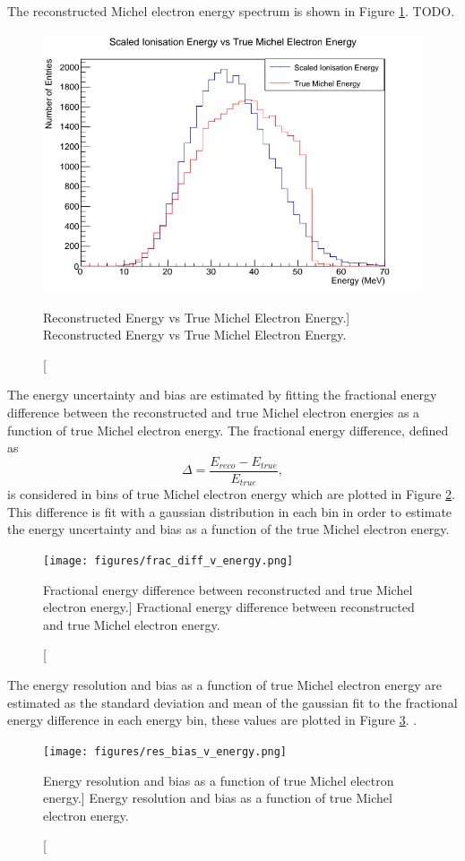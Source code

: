 The reconstructed Michel electron energy spectrum is shown in Figure
\ref{fig:reco_v_mich}. TODO.
\begin{figure}
	\centering
	\includegraphics[width=\textwidth, height=0.68\textwidth]{figures/reco_v_mich.png}
	\caption
	[Reconstructed Energy vs True Michel Electron Energy.]
	{Reconstructed Energy vs True Michel Electron Energy.}
	\label{fig:reco_v_mich}
\end{figure}


The energy uncertainty and bias are estimated by fitting the fractional energy 
difference between the reconstructed and true Michel electron energies as a 
function of true Michel electron energy. The fractional energy difference, 
defined as 
\begin{equation}
	\Delta = \frac{E_{reco} - E_{true}}{E_{true}},
\end{equation}
is considered in bins of true Michel electron energy which are plotted in Figure
\ref{fig:frac_diff_energy}. This difference is fit with a gaussian distribution in each
bin in order to estimate the energy uncertainty and bias as a function of the 
true Michel electron energy.
\begin{figure}
	\centering
	\texttt{[image: figures/frac\_diff\_v\_energy.png]}
	\caption
	[Fractional energy difference between reconstructed and true Michel electron
	energy.]
	{Fractional energy difference between reconstructed and true Michel electron
	energy.}
	\label{fig:frac_diff_energy}
\end{figure}

The energy resolution and bias as a function of true Michel electron energy are 
estimated as the standard deviation and mean of the gaussian fit to the
fractional energy difference in each energy bin, these values are plotted in
Figure \ref{fig:res_and_bias_energy}. .
\begin{figure}
	\centering
	\texttt{[image: figures/res\_bias\_v\_energy.png]}
	\caption
	[Energy resolution and bias as a function of true Michel electron energy.]
	{Energy resolution and bias as a function of true Michel electron energy.}
	\label{fig:res_and_bias_energy}
\end{figure}

